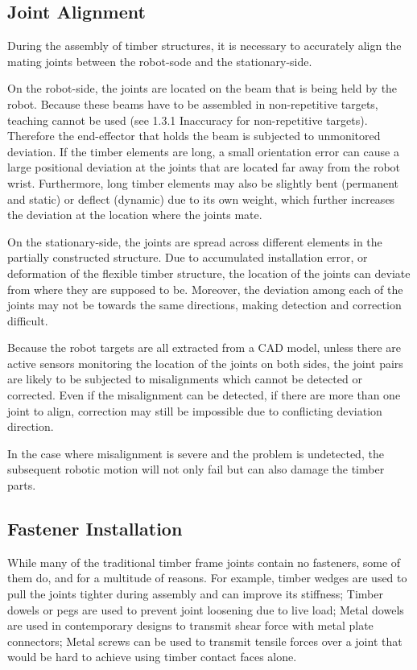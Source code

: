 \subsection{Joint Alignment}

During the assembly of timber structures, it is necessary to accurately align the mating joints between the robot-sode and the stationary-side.

On the robot-side, the joints are located on the beam that is being held by the robot. Because these beams have to be assembled in non-repetitive targets, teaching cannot be used (see 1.3.1 Inaccuracy for non-repetitive targets). Therefore the end-effector that holds the beam is subjected to unmonitored deviation. If the timber elements are long, a small orientation error can cause a large positional deviation at the joints that are located far away from the robot wrist. Furthermore, long timber elements may also be slightly bent (permanent and static) or deflect (dynamic) due to its own weight, which further increases the deviation at the location where the joints mate.

On the stationary-side, the joints are spread across different elements in the partially constructed structure. Due to accumulated installation error, or deformation of the flexible timber structure, the location of the joints can deviate from where they are supposed to be. Moreover, the deviation among each of the joints may not be towards the same directions, making detection and correction difficult.

Because the robot targets are all extracted from a CAD model, unless there are active sensors monitoring the location of the joints on both sides, the joint pairs are likely to be subjected to misalignments which cannot be detected or corrected. Even if the misalignment can be detected, if there are more than one joint to align, correction may still be impossible due to conflicting deviation direction.

In the case where misalignment is severe and the problem is undetected, the subsequent robotic motion will not only fail but can also damage the timber parts. 

\subsection{Fastener Installation}

While many of the traditional timber frame joints contain no fasteners, some of them do, and for a multitude of reasons. For example, timber wedges are used to pull the joints tighter during assembly and can improve its stiffness; Timber dowels or pegs are used to prevent joint loosening due to live load; Metal dowels are used in contemporary designs to transmit shear force with metal plate connectors; Metal screws can be used to transmit tensile forces over a joint that would be hard to achieve using timber contact faces alone. 

